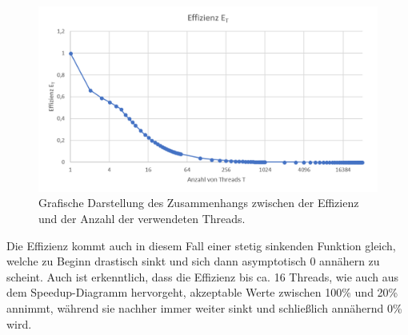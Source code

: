 \begin{description}
						\begin{figure}
							\centering	
							\includegraphics[width=12cm]{Abbildungen/Effizienz_Threads.png}
							\caption{Grafische Darstellung des Zusammenhangs zwischen der Effizienz und der Anzahl der verwendeten Threads.}
							\label{fig:Effizienz_Threads}
						\end{figure}
						
						Die Effizienz kommt auch in diesem Fall einer stetig sinkenden Funktion gleich, welche zu Beginn drastisch sinkt und sich dann asymptotisch 0 annähern zu scheint. Auch ist erkenntlich, dass die Effizienz bis ca. 16 Threads, wie auch aus dem Speedup-Diagramm hervorgeht, akzeptable Werte zwischen 100\% und 20\% annimmt, während sie nachher immer weiter sinkt und schließlich annähernd 0\% wird.
						
				\end{description}
